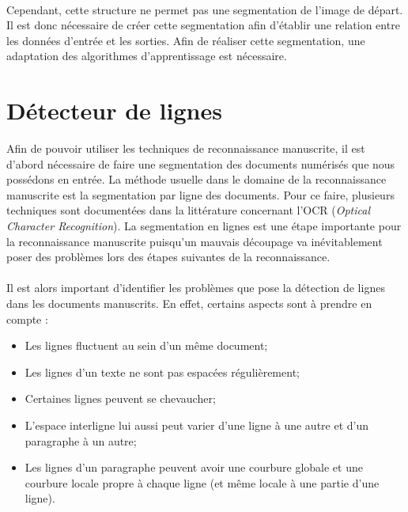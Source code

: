 \paragraph{}
Cependant, cette structure ne permet pas une segmentation de l'image de départ. Il est donc nécessaire de créer
cette segmentation afin d'établir une relation entre les données d'entrée et les sorties. Afin de réaliser cette
segmentation, une adaptation des algorithmes d'apprentissage est nécessaire.

\section{Détecteur de lignes}

Afin de pouvoir utiliser les techniques de reconnaissance manuscrite, il est d'abord nécessaire
de faire une segmentation des documents numérisés que nous possédons en entrée. La méthode
usuelle dans le domaine de la reconnaissance manuscrite est la segmentation par ligne des documents.
Pour ce faire, plusieurs techniques sont documentées dans la littérature concernant l'OCR
(\textit{Optical Character Recognition}). La segmentation en lignes est une étape importante pour
la reconnaissance manuscrite puisqu'un mauvais découpage va inévitablement poser des problèmes
lors des étapes suivantes de la reconnaissance.

\paragraph{}
Il est alors important d'identifier les problèmes que pose la détection de lignes dans les documents manuscrits.
En effet, certains aspects sont à prendre en compte :
\begin{itemize}
\item Les lignes fluctuent au sein d'un même document;
\item Les lignes d'un texte ne sont pas espacées régulièrement;
\item Certaines lignes peuvent se chevaucher;
\item L'espace interligne lui aussi peut varier d'une ligne à une autre et d'un paragraphe à un autre;
\item Les lignes d'un paragraphe peuvent avoir une courbure globale et une courbure locale propre à
chaque ligne (et même locale à une partie d'une ligne).
\end{itemize}


